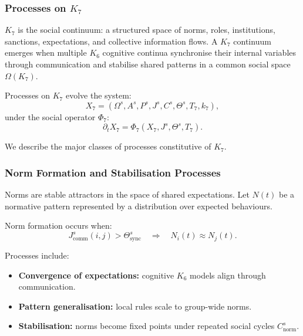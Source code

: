 

\subsubsection{Processes on \texorpdfstring{$K_7$}{K_7}}
\label{sec:processes-k7}

$K_7$ is the social continuum: a structured space of norms, roles,
institutions, sanctions, expectations, and collective information flows.
A $K_7$ continuum emerges when multiple $K_6$ cognitive continua
synchronise their internal variables through communication and
stabilise shared patterns in a common social space $\Omega(K_7)$.

Processes on $K_7$ evolve the system:
\[
X_7 = (\Omega^s, A^s, P^s, J^s, C^s, \Theta^s, T_7, k_7),
\]
under the social operator $\Phi_7$:
\[
\partial_t X_7 = \Phi_7(X_7, J^s, \Theta^s, T_7).
\]

We describe the major classes of processes constitutive of $K_7$.

\subsubsection{Norm Formation and Stabilisation Processes}

Norms are stable attractors in the space of shared expectations.
Let $N(t)$ be a normative pattern represented by a distribution over
expected behaviours.

Norm formation occurs when:
\[
J^s_{\text{comm}}(i,j) > \Theta^s_{\text{sync}}
\quad\Rightarrow\quad
N_i(t) \approx N_j(t).
\]

Processes include:
\begin{itemize}
    \item \textbf{Convergence of expectations:}
    cognitive $K_6$ models align through communication.
    \item \textbf{Pattern generalisation:}
    local rules scale to group-wide norms.
    \item \textbf{Stabilisation:}
    norms become fixed points under repeated social cycles $C^s_{\text{norm}}$.
\end{itemize}

